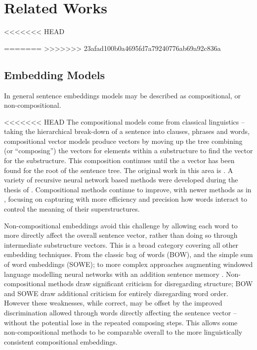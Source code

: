 \documentclass[11pt]{article}
\theoremstyle{plain}
\theoremstyle{definition}
\begin{document}
\section{Related Works}\label{relwork}
<<<<<<< HEAD

=======
>>>>>>> 23afad100b0a4695fd7a79240776ab69a92c836a
\subsection{Embedding Models}
In general sentence embeddings models may be described as compositional, or non-compositional. 

<<<<<<< HEAD
The compositional models come from classical linguistics -- taking the hierarchical  break-down of a sentence into clauses, phrases and words, compositional vector models produce vectors by moving up the tree combining (or ``composing'') the vectors for elements within a substructure to find the vector for the substructure. This composition continues until the a vector has been found for the root of the sentence tree. The original work in this area is \textcite{Mitchell2008}. A variety of recursive neural network based methods were developed during the thesis of \textcite{socher2014recursive}. Compositional methods continue to improve, with newer methods as in \textcite{TACL15CompVector}, focusing on capturing with more efficiency and precision how words interact to control the meaning of their superstructures. 



Non-compositional embeddings avoid this challenge by allowing each word to more directly affect the overall sentence vector, rather than doing so through intermediate substructure vectors. This is a broad category covering all other embedding techniques. From the classic bag of words (BOW), and the simple sum of word embeddings (SOWE); to more complex approaches augmenting windowed language modelling neural networks with an addition sentence memory \parencite{le2014distributed}.  Non-compositional methods draw significant criticism for disregarding structure; BOW and SOWE draw additional criticism for entirely disregarding word order. However these weaknesses, while correct, may be offset by the improved discrimination allowed through words directly affecting the sentence vector -- without the potential lose in the repeated composing steps. This allows some non-compositional methods to be comparable overall to the more linguistically consistent compositional embeddings. 
\end{document}
